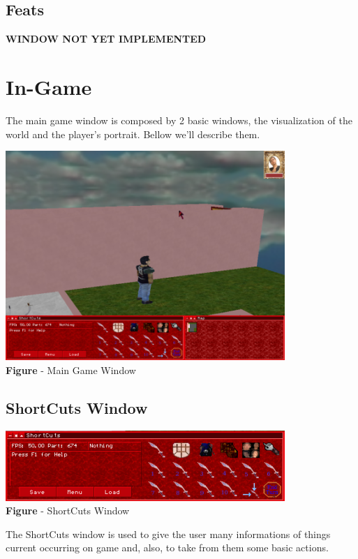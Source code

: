 \documentclass[ letterpaper,12pt]{article}
\begin{document}
\subsection{Feats}

{\bf WINDOW NOT YET IMPLEMENTED}

\section{In-Game}

The main game window is composed by 2 basic windows, the visualization of the world and the player's portrait. Bellow we'll describe them.

\begin{center}
  \includegraphics{mainGame.png}
\\{\bf Figure} - Main Game Window
\end{center}

\subsection{ShortCuts Window}

\begin{center}
  \includegraphics{shortcutsWindow.png}
\\{\bf Figure} - ShortCuts Window
\end{center}

The ShortCuts window is used to give the user many informations of things current occurring on game and, also, to take from them some basic actions.
\end{document}
